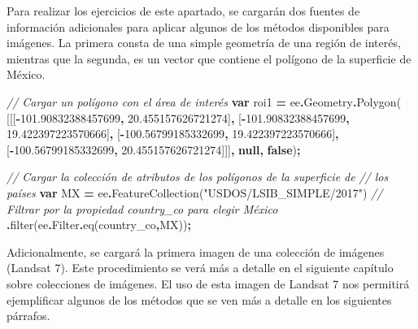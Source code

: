 \documentclass[
  12pt,
  letterpaper,
  twoside]{book}
\newenvironment{Shaded}{\begin{snugshade}}{\end{snugshade}}
\newcommand{\AttributeTok}[1]{\textcolor[rgb]{0.77,0.63,0.00}{#1}}
\newcommand{\CommentTok}[1]{\textcolor[rgb]{0.56,0.35,0.01}{\textit{#1}}}
\newcommand{\FloatTok}[1]{\textcolor[rgb]{0.00,0.00,0.81}{#1}}
\newcommand{\FunctionTok}[1]{\textcolor[rgb]{0.00,0.00,0.00}{#1}}
\newcommand{\KeywordTok}[1]{\textcolor[rgb]{0.13,0.29,0.53}{\textbf{#1}}}
\newcommand{\NormalTok}[1]{#1}
\newcommand{\OperatorTok}[1]{\textcolor[rgb]{0.81,0.36,0.00}{\textbf{#1}}}
\newcommand{\StringTok}[1]{\textcolor[rgb]{0.31,0.60,0.02}{#1}}
\begin{document}
Para realizar los ejercicios de este apartado, se cargarán dos fuentes de información adicionales para aplicar algunos de los métodos disponibles para imágenes. La primera consta de una simple geometría de una región de interés, mientras que la segunda, es un vector que contiene el polígono de la superficie de México.

\begin{Shaded}
\begin{Highlighting}[]
\CommentTok{// Cargar un polígono con el área de interés}
\KeywordTok{var}\NormalTok{ roi1 }\OperatorTok{=}\NormalTok{ ee}\OperatorTok{.}\AttributeTok{Geometry}\OperatorTok{.}\FunctionTok{Polygon}\NormalTok{(}
\NormalTok{        [[[}\OperatorTok{{-}}\FloatTok{101.90832388457699}\OperatorTok{,} \FloatTok{20.455157626721274}\NormalTok{]}\OperatorTok{,}
\NormalTok{          [}\OperatorTok{{-}}\FloatTok{101.90832388457699}\OperatorTok{,} \FloatTok{19.422397223570666}\NormalTok{]}\OperatorTok{,}
\NormalTok{          [}\OperatorTok{{-}}\FloatTok{100.56799185332699}\OperatorTok{,} \FloatTok{19.422397223570666}\NormalTok{]}\OperatorTok{,}
\NormalTok{          [}\OperatorTok{{-}}\FloatTok{100.56799185332699}\OperatorTok{,} \FloatTok{20.455157626721274}\NormalTok{]]]}\OperatorTok{,} \KeywordTok{null}\OperatorTok{,} \KeywordTok{false}\NormalTok{)}\OperatorTok{;}

\CommentTok{// Cargar la colección de atributos de los polígonos de la superficie de }
\CommentTok{// los países}
\KeywordTok{var}\NormalTok{ MX }\OperatorTok{=}\NormalTok{ ee}\OperatorTok{.}\FunctionTok{FeatureCollection}\NormalTok{(}\StringTok{"USDOS/LSIB\_SIMPLE/2017"}\NormalTok{)}
  \CommentTok{// Filtrar por la propiedad country\_co para elegir México}
  \OperatorTok{.}\FunctionTok{filter}\NormalTok{(ee}\OperatorTok{.}\AttributeTok{Filter}\OperatorTok{.}\FunctionTok{eq}\NormalTok{(}\StringTok{\textquotesingle{}country\_co\textquotesingle{}}\OperatorTok{,}\StringTok{\textquotesingle{}MX\textquotesingle{}}\NormalTok{))}\OperatorTok{;}
\end{Highlighting}
\end{Shaded}

Adicionalmente, se cargará la primera imagen de una colección de imágenes (Landsat 7). Este procedimiento se verá más a detalle en el siguiente capítulo sobre colecciones de imágenes. El uso de esta imagen de Landsat 7 nos permitirá ejemplificar algunos de los métodos que se ven más a detalle en los siguientes párrafos.
\end{document}
